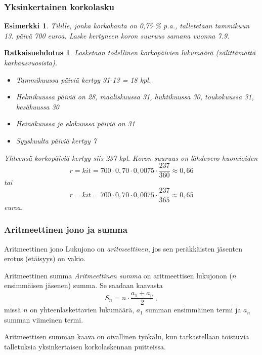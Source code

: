 \documentclass[]{beamer}\usepackage[]{graphicx}\usepackage[]{color}
\newtheorem{esim}{Esimerkki}
\newtheorem{ratkaisu}{Ratkaisuehdotus}
\begin{document}
\begin{frame}
    \frametitle{Yksinkertainen korkolasku}
    \begin{esim}
        Tilille, jonka korkokanta on 0,75 \% p.a., talletetaan tammikuun 13. päivä 700 euroa. \pause
        Laske kertyneen koron suuruus samana vuonna 7.9. 
    \end{esim}
\end{frame}

\begin{frame}
    \begin{ratkaisu}
      Lasketaan todellinen korkopäivien lukumäärä (välittämättä karkausvuosista).
      \begin{itemize}
          \item Tammikuussa päiviä kertyy 31-13 = 18 kpl.
          \item Helmikuussa päiviä on 28, maaliskuussa 31, huhtikuussa 30, toukokuussa 31, kesäkuussa 30
          \item Heinäkuussa ja elokuussa päiviä on 31
          \item Syyskuulta päiviä kertyy 7
      \end{itemize}
      \pause Yhteensä korkopäiviä kertyy siis 237 kpl. \pause Koron suuruus on lähdevero huomioiden
      \[
          r = kit = 700\cdot 0,70\cdot0,0075\cdot\frac{237}{360} \approx 0{,}66
      \]
      tai
      \[
          r = kit = 700\cdot 0,70\cdot0,0075\cdot\frac{237}{365} \approx 0{,}65
      \]
      euroa.
    \end{ratkaisu}
\end{frame}

\begin{frame}
    \frametitle{Aritmeettinen jono ja summa}
    \begin{block}{Aritmeettinen jono}
        Lukujono \pause on \emph{aritmeettinen}, jos sen peräkkäisten jäsenten erotus (etäisyys) on vakio.
    \end{block}
    \pause
    \begin{block}{Aritmeettinen summa}
        \emph{Aritmeettinen summa} \pause on aritmeettisen lukujonon ($n$ ensimmäisen jäsenen) summa. \pause Se saadaan kaavasta
        \[
            S_n = n \cdot \frac{a_1 + a_n}{2}\,,
        \]
        \pause missä $n$ on yhteenlaskettavien lukumäärä, \pause $a_1$ summan ensimmäinen termi ja \pause $a_n$ summan viimeinen termi.
    \end{block}
    \pause
    Aritmeettisen summan kaava on oivallinen työkalu, kun tarkastellaan toistuvia talletuksia yksinkertaisen korkolaskennan puitteissa.
\end{frame}
\end{document}
